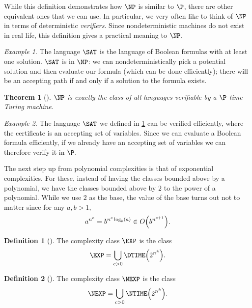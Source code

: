 \documentclass[english,12pt]{reedthesis}
\theoremstyle{plain}
\newtheorem{thm}{Theorem}[section]
\theoremstyle{definition}
\newtheorem{defn}[defn]{Definition}
\theoremstyle{remark}
\newtheorem{example}{Example}[thm]
\begin{document}
While this definition demonstrates how $\NP$ is similar to $\P$, there are other
equivalent ones that we can use. In particular, we very often like to think of
$\NP$ in terms of deterministic \emph{verifiers}. Since nondeterministic
machines do not exist in real life, this definition gives a practical meaning to
$\NP$.

\begin{example}\label{ex:sat-is-np}
  The language $\SAT$ is the language of Boolean formulas with at least one
  solution. $\SAT$ is in $\NP$: we can nondeterministically pick a potential
  solution and then evaluate our formula (which can be done efficiently); there
  will be an accepting path if and only if a solution to the formula exists.
\end{example}

\begin{thm}[{\cite[Def.\ 7.19]{Sip97}}]\label{thm:np-verifier}
  $\NP$ is exactly the class of all languages verifiable by a $\P$-time Turing
  machine.
\end{thm}


\begin{example}\label{ex:sat-np-verifier}
  The language $\SAT$ we defined in \cref{ex:sat-is-np} can be verified
  efficiently, where the certificate is an accepting set of variables. Since we
  can evaluate a Boolean formula efficiently, if we already have an accepting
  set of variables we can therefore verify it in $\P$.
\end{example}

The next step up from polynomial complexities is that of exponential
complexities. For these, instead of having the classes bounded above by a
polynomial, we have the classes bounded above by $2$ to the power of a
polynomial. While we use $2$ as the base, the value of the base turns out not to
matter since for any $a, b > 1$,
\begin{equation}
  a^{n^{c}} = b^{n^{c}\log_{b}(a)} \in O\mleft(b^{n^{c+1}}\mright).
\end{equation}

\begin{defn}[{\cite[.2]{AB09}}]\label{def:exp}
  The complexity class $\EXP$ is the class
  \[
    \EXP = \bigcup_{c > 0}\DTIME\mleft(2^{n^{k}}\mright).
  \]
\end{defn}

\begin{defn}[{\cite[.2]{AB09}}]\label{def:nexp}
  The complexity class $\NEXP$ is the class
  \[
    \NEXP = \bigcup_{c > 0}\NTIME\mleft(2^{n^{k}}\mright).
  \]
\end{defn}
\end{document}
